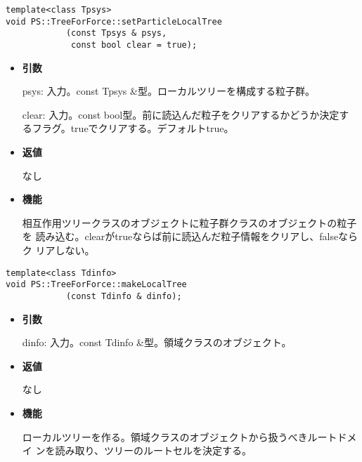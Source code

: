 \begin{screen}
\begin{verbatim}
template<class Tpsys>
void PS::TreeForForce::setParticleLocalTree
            (const Tpsys & psys,
             const bool clear = true);
\end{verbatim}
\end{screen}

\begin{itemize}

\item {\bf 引数}

psys: 入力。const Tpsys \&型。ローカルツリーを構成する粒子群。

clear: 入力。const bool型。前に読込んだ粒子をクリアするかどうか決定す
るフラグ。trueでクリアする。デフォルトtrue。

\item {\bf 返値}

なし

\item {\bf 機能}

相互作用ツリークラスのオブジェクトに粒子群クラスのオブジェクトの粒子を
読み込む。clearがtrueならば前に読込んだ粒子情報をクリアし、falseならク
リアしない。

\end{itemize}


\begin{screen}
\begin{verbatim}
template<class Tdinfo>
void PS::TreeForForce::makeLocalTree
            (const Tdinfo & dinfo);
\end{verbatim}
\end{screen}

\begin{itemize}

\item {\bf 引数}

dinfo: 入力。const Tdinfo \&型。領域クラスのオブジェクト。

\item {\bf 返値}

なし

\item {\bf 機能}

ローカルツリーを作る。領域クラスのオブジェクトから扱うべきルートドメイ
ンを読み取り、ツリーのルートセルを決定する。

\end{itemize}

